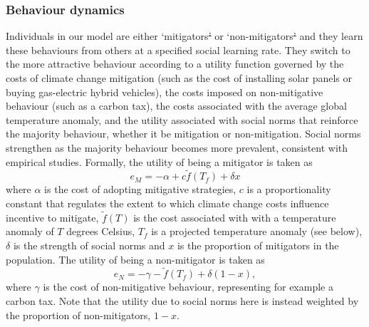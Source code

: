 \documentclass[10pt,letterpaper]{article}
\providecommand{\DIFaddtex}[1]{{\protect\color{blue}\uwave{#1}}} %
\providecommand{\DIFdeltex}[1]{{\protect\color{red}\sout{#1}}}                      %
\providecommand{\DIFaddbegin}{} %
\providecommand{\DIFaddend}{} %
\providecommand{\DIFdelbegin}{} %
\providecommand{\DIFdelend}{} %
\providecommand{\DIFadd}[1]{\texorpdfstring{\DIFaddtex{#1}}{#1}} %
\providecommand{\DIFdel}[1]{\texorpdfstring{\DIFdeltex{#1}}{}} %
\begin{document}

\subsubsection*{Behaviour dynamics} Individuals in our model are either `mitigators\DIFdelbegin \DIFdel{’ }\DIFdelend \DIFaddbegin \DIFadd{? }\DIFaddend or `non-mitigators\DIFdelbegin \DIFdel{’ }\DIFdelend \DIFaddbegin \DIFadd{? }\DIFaddend and they learn these behaviours from others at a specified social learning rate. They switch to the more attractive behaviour according to a utility function governed by the costs of climate change mitigation (such as the cost of installing solar panels or buying gas-electric hybrid vehicles), the costs imposed on non-mitigative behaviour (such as a carbon tax), the costs associated with the average global temperature anomaly, and the utility associated with social norms that reinforce the majority behaviour, whether it be mitigation or non-mitigation. Social norms strengthen as the majority behaviour becomes more prevalent, consistent with empirical studies\cite{bollinger12,nolan08}. Formally, the utility of being a mitigator is taken as
\begin{equation}
e_M = -\alpha + c \tilde{f}(T_f) +  \delta x
\end{equation}
where $\alpha$ is the cost of adopting mitigative strategies, $c$ is a proportionality constant that regulates the extent to which climate change costs influence incentive to mitigate, $\tilde{f}(T)$ is the cost associated with with a temperature anomaly of $T$ degrees Celsius, $T_f$ is a projected temperature anomaly (see below), $\delta$ is the strength of social norms and $x$ is the proportion of mitigators in the population. The utility of being a non-mitigator is taken as
\begin{equation}
e_N = -\gamma -\tilde{f}(T_f) + \delta(1-x),
\end{equation}
where $\gamma$ is the cost of non-mitigative behaviour, representing for example a carbon tax. Note that the utility due to social norms here is instead weighted by the proportion of non-mitigators, $1-x$.
\end{document}
